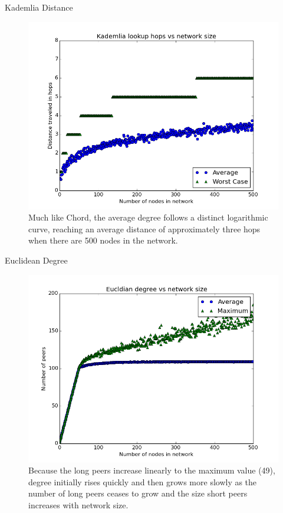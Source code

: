 \documentclass[11pt]{beamer}
\begin{document}
\begin{frame}{Kademlia Distance}
\begin{figure}
	\centering
	\includegraphics[width=0.7\linewidth]{figs/KademliaDistance}
	\caption[Kademlia hops]{Much like Chord, the average degree follows a distinct logarithmic curve, reaching an average distance of approximately three hops when there are 500 nodes in the network.}
	\label{fig:KademliaDistance}
\end{figure}
\end{frame}


\begin{frame}{Euclidean Degree}

\begin{figure}
	\centering
	\includegraphics[width=0.7\linewidth]{figs/EucldianDegree}
	\caption[Growth of UrDHT degree]{Because the long peers increase linearly to the maximum value (49), degree initially rises quickly and then grows  more slowly as the number of long peers ceases to grow and the size short peers increases with network size. }
	\label{fig:EucldianDegree}
\end{figure}
\end{frame}
\end{document}
